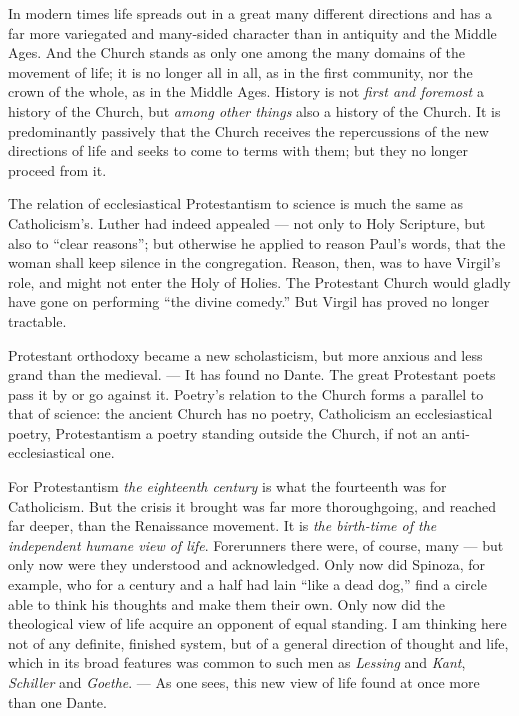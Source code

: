 \documentclass[12pt,a4paper,openany]{book}
\newcommand{\opage}[1]{\marginnote{\footnotesize\textit{[#1]}}}
\begin{document}
In modern times life spreads out in a great many different directions and has
a far more variegated and many-sided character than in antiquity and the
Middle Ages. And the Church stands as only one among the many domains of the
movement of life; it
\opage{199}is no longer all in all, as in the first community, nor
the crown of the whole, as in the Middle Ages. History is not \emph{first and
foremost} a history of the Church, but \emph{among other things} also a history of
the Church. It is predominantly passively that the Church receives the
repercussions of the new directions of life and seeks to come to terms with them; but they
no longer proceed from it.

The relation of ecclesiastical Protestantism to science is much the same as
Catholicism's. Luther had indeed appealed --- not only to Holy Scripture, but
also to ``clear reasons''; but otherwise he applied to reason Paul's words,
that the woman shall keep silence in the congregation. Reason, then, was to
have Virgil's role, and might not enter the Holy of Holies. The Protestant
Church would gladly have gone on performing ``the divine comedy.'' But Virgil
has proved no longer tractable.

Protestant orthodoxy became a new scholasticism, but more anxious and less
grand than the medieval. --- It has found no Dante. The great Protestant poets
pass it by or go against it. Poetry's relation to the Church forms a parallel
to that of science: the ancient Church has no poetry, Catholicism an
ecclesiastical poetry, Protestantism a poetry standing outside the Church, if
not an anti-ecclesiastical one.

For Protestantism \emph{the eighteenth century} is what the fourteenth was for
Catholicism. But the crisis it brought was far more thoroughgoing, and reached
far deeper, than the Renaissance movement. It is \emph{the birth-time of the
independent humane view of life}. Forerunners there were, of course, many ---
but only now were they understood and acknowledged. Only now did Spinoza, for
example, who for a century and a half had lain ``like a dead dog,'' find a
circle able to think his thoughts and make them their own. Only now did the
theological view of life acquire an opponent of equal standing. I am thinking
here not of any definite, finished system, but of a general direction of
thought and life, which in its broad features was common to such men as
\emph{Lessing} and \emph{Kant}, \emph{Schiller} and \emph{Goethe}. --- As one sees, this new view of life
found at once more than one Dante.
\end{document}
